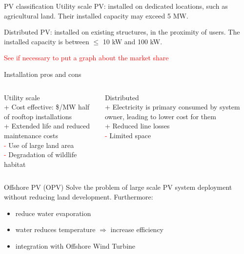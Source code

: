 \documentclass[aspectratio=169, 12pt]{beamer}
\begin{document}
\begin{frame}{PV classification}
 \textcolor{NTNUBlue}{Utility scale PV}: installed on dedicated locations, such as agricultural land. Their installed capacity may exceed 5 MW.

 \textcolor{NTNUBlue}{Distributed PV}: installed on existing structures, in the proximity of users. The installed capacity is between $\le$ 10 kW and 100 kW.

 \textcolor{red}{See if necessary to put a graph about the market share}
\end{frame}

\begin{frame}{Installation pros and cons}
  \begin{columns}
    \begin{column}{0.5\columnwidth}
      {\center \textcolor{NTNUBlue}{Utility scale}}\\
      \textcolor{NTNUgreen}{+} Cost effective: \$/MW half of rooftop installations\\
      \textcolor{NTNUgreen}{+} Extended life and reduced maintenance costs\\
      \textcolor{red}{-} Use of large land area\\
      \textcolor{red}{-} Degradation of wildlife habitat
    \end{column}
    \begin{column}{0.5\columnwidth}
      {\center \textcolor{NTNUBlue}{Distributed}}\\
      \textcolor{NTNUgreen}{+} Electricity is primary consumed by system owner, leading to lower cost for them\\
      \textcolor{NTNUgreen}{+} Reduced line losses\\
      \textcolor{red}{-} Limited space
    \end{column}
  \end{columns}
\end{frame}

\begin{frame}{Offshore PV (OPV)}
  Solve the problem of large scale PV system deployment without reducing land development. Furthermore: 
  \begin{itemize}
    \item reduce water evaporation
    \item water reduces temperature $\Rightarrow$ increase efficiency
    \item integration with Offshore Wind Turbine
  \end{itemize} 
\end{frame}
\end{document}
